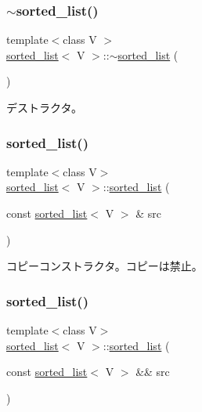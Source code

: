 \subsubsection{\texorpdfstring{$\sim$sorted\+\_\+list()}{~sorted\_list()}}
{\footnotesize\ttfamily template$<$class V $>$ \\
\hyperlink{classsorted__list}{sorted\+\_\+list}$<$ V $>$\+::$\sim$\hyperlink{classsorted__list}{sorted\+\_\+list} (\begin{DoxyParamCaption}{ }\end{DoxyParamCaption})\hspace{0.3cm}{\ttfamily [virtual]}}

デストラクタ。 \hypertarget{classsorted__list_a93a0122771586ec16c2d4015bba1a1e1}{}\label{classsorted__list_a93a0122771586ec16c2d4015bba1a1e1} 
\subsubsection{\texorpdfstring{sorted\+\_\+list()}{sorted\_list()}\hspace{0.1cm}{\footnotesize\ttfamily [2/3]}}
{\footnotesize\ttfamily template$<$class V$>$ \\
\hyperlink{classsorted__list}{sorted\+\_\+list}$<$ V $>$\+::\hyperlink{classsorted__list}{sorted\+\_\+list} (\begin{DoxyParamCaption}\item[{const \hyperlink{classsorted__list}{sorted\+\_\+list}$<$ V $>$ \&}]{src }\end{DoxyParamCaption})\hspace{0.3cm}{\ttfamily [delete]}}

コピーコンストラクタ。コピーは禁止。 \hypertarget{classsorted__list_a2a822145165024c18095c4305db1c8f6}{}\label{classsorted__list_a2a822145165024c18095c4305db1c8f6} 
\subsubsection{\texorpdfstring{sorted\+\_\+list()}{sorted\_list()}\hspace{0.1cm}{\footnotesize\ttfamily [3/3]}}
{\footnotesize\ttfamily template$<$class V$>$ \\
\hyperlink{classsorted__list}{sorted\+\_\+list}$<$ V $>$\+::\hyperlink{classsorted__list}{sorted\+\_\+list} (\begin{DoxyParamCaption}\item[{const \hyperlink{classsorted__list}{sorted\+\_\+list}$<$ V $>$ \&\&}]{src }\end{DoxyParamCaption})\hspace{0.3cm}{\ttfamily [delete]}}

